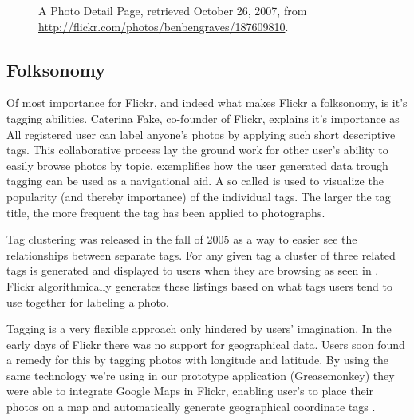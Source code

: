 \begin{figure}
\begin{whole}
\begin{minipage}[t]{0.475\wholewidth}
      \caption[Flickr Photo Detail Page]{%
         A Photo Detail Page,
         retrieved October 26, 2007, from
         \url{http://flickr.com/photos/benbengraves/187609810}.}
      \label{figure:scrsh.flickr.photo.detail}
    \end{minipage}
  \end{whole}
  \normalcaption
\end{figure}

\subsection{Folksonomy}
Of most importance
for Flickr, and indeed what makes Flickr a folksonomy, is it's tagging
abilities. Caterina Fake, co-founder of Flickr, explains it's importance as
All registered user can label anyone's photos by applying such short
descriptive tags. This collaborative process lay the ground work for other
user's ability to easily browse photos by topic.
exemplifies how the user generated data trough tagging can be used as a
navigational aid. A so called  is used to visualize the
popularity (and thereby importance) of the individual tags. The larger the
tag title, the more frequent the tag has been applied to photographs.

Tag clustering was released in the fall of 2005 \citep{butterfield05} as a way
to easier see the relationships between separate tags. For any given tag a
cluster of three related tags is generated and displayed to users when they
are browsing as seen in
.
Flickr algorithmically generates these listings based on what tags users tend
to use together for labeling a photo.

Tagging is a very flexible approach only hindered by users' imagination. In the
early days of Flickr there was no support for geographical data. Users soon
found a remedy for this by tagging photos with longitude and latitude. By
using the same technology we're using in our prototype application
(Greasemonkey) they were able to integrate Google Maps%
 in Flickr, enabling user's to place their photos on a map and automatically
generate geographical coordinate tags%
.

